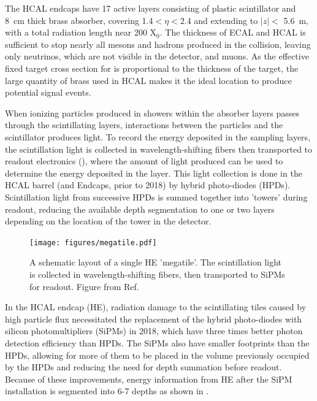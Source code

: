 The HCAL endcaps have 17 active layers consisting of plastic scintillator and \SI{8}{\centi\meter} thick brass absorber, covering 1.4$<\eta<$2.4 and extending to $\lvert z \rvert<$ \SI{5.6}{\meter}, with a total radiation length near 200 X$_0$. 
The thickness of ECAL and HCAL is sufficient to stop nearly all mesons and hadrons produced in the collision, leaving only neutrinos, which are not visible in the detector, and muons. 
As the effective fixed target cross section for \dbrem is proportional to the thickness of the target, the large quantity of brass used in HCAL makes it the ideal location to produce potential signal events.

When ionizing particles produced in showers within the absorber layers passes through the scintillating layers, interactions between the particles and the scintillator produces light.
To record the energy deposited in the sampling layers, the scintillation light is collected in wavelength-shifting fibers then transported to readout electronics (), where the amount of light produced can be used to determine the energy deposited in the layer.
This light collection is done in the HCAL barrel (and Endcaps, prior to 2018) by hybrid photo-diodes (HPDs). 
Scintillation light from successive HPDs is summed together into 'towers' during readout, reducing the available depth segmentation to one or two layers depending on the location of the tower in the detector.

\begin{figure}[!htpb]
	   \centering
	      \texttt{[image: figures/megatile.pdf]}
		 \caption[An HCAL Tile]{A schematic layout of a single HE 'megatile'. The scintillation light is collected in wavelength-shifting fibers, then transported to SiPMs for readout. Figure from Ref.\cite{sipmRadDam}}
	    \label{fig:megatile}
\end{figure}

In the HCAL endcap (HE), radiation damage to the scintillating tiles caused by high particle flux necessitated the replacement of the hybrid photo-diodes with silicon photomultipliers (SiPMs) in 2018, which have three times better photon detection efficiency than HPDs.  
The SiPMs also have smaller footprints than the HPDs, allowing for more of them to be placed in the volume previously occupied by the HPDs and reducing the need for depth summation before readout. 
Because of these improvements, energy information from HE after the SiPM installation is segmented into 6-7 depths as shown in .

